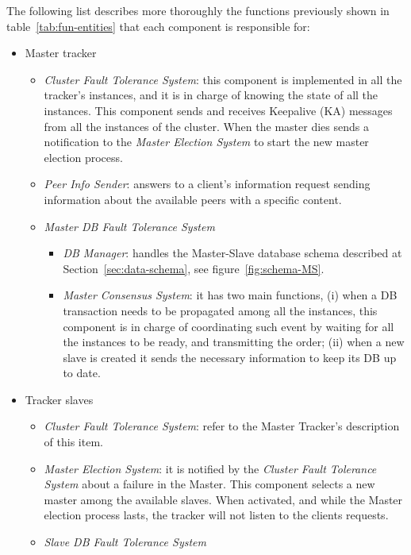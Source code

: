\documentclass[twoside,a4paper,10pt]{article}
\begin{document}
The following list describes more thoroughly the functions previously shown in
table~\ref{tab:fun-entities} that each component is responsible for:

\begin{itemize}
\item Master tracker
  \begin{itemize}
  \item \emph{Cluster Fault Tolerance System}: this component is implemented
    in all the tracker's instances, and it is in charge of knowing the state
    of all the instances. This component sends and receives Keepalive (KA)
    messages from all the instances of the cluster.
    When the master dies sends a
    notification to the \emph{Master Election System} to start the new master
    election process.
  \item \emph{Peer Info Sender}: answers to a client's information request 
    sending
    information about the available peers with a specific content.
  \item \emph{Master DB Fault Tolerance System}
    \begin{itemize}
    \item \emph{DB Manager}: handles the Master-Slave database schema described
      at Section~\ref{sec:data-schema}, see figure~\ref{fig:schema-MS}.
    \item \emph{Master Consensus System}: it has two main functions, (i) when a
      DB transaction needs to be propagated among all the instances,
      this component is in charge of coordinating such event by waiting for all
      the instances to be ready, and transmitting the order; (ii) when a
      new slave is created it sends the necessary information to keep its
      DB up to date.
    \end{itemize}
  \end{itemize}
\item Tracker slaves
  \begin{itemize}
  \item \emph{Cluster Fault Tolerance System}: refer to the Master Tracker's
    description of this item.
  \item \emph{Master Election System}: it is notified by the
    \emph{Cluster Fault Tolerance System} about a failure in the Master. This
    component selects a new master among the available slaves. When activated,
    and while the Master election process lasts, the tracker will not listen to
    the clients requests.
  \item \emph{Slave DB Fault Tolerance System}

\end{itemize}
\end{itemize}
\end{document}
